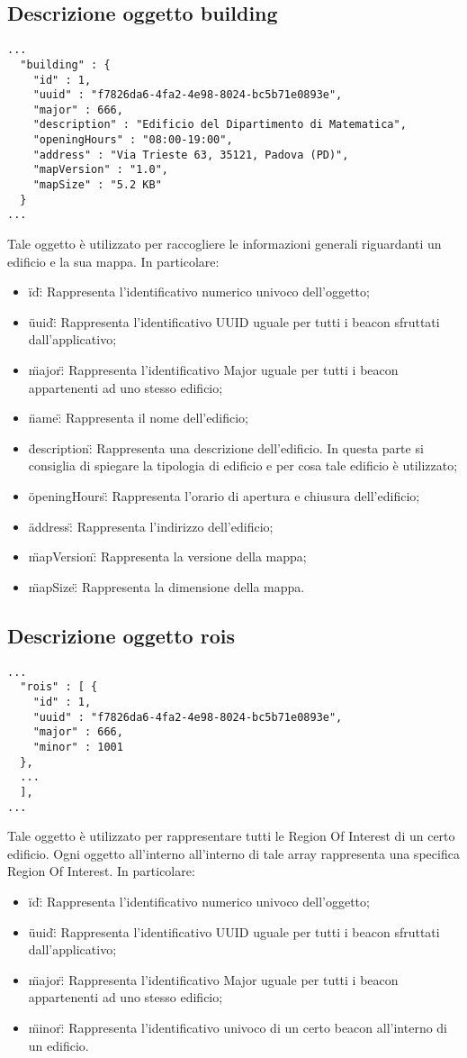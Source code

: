 \documentclass[../ManualeSviluppatore.tex]{subfiles}
\begin{document}
	\subsection{Descrizione oggetto building}
		\begin{lstlisting}
...
  "building" : {
    "id" : 1,
    "uuid" : "f7826da6-4fa2-4e98-8024-bc5b71e0893e",
    "major" : 666,
    "description" : "Edificio del Dipartimento di Matematica",
    "openingHours" : "08:00-19:00",
    "address" : "Via Trieste 63, 35121, Padova (PD)",
    "mapVersion" : "1.0",
    "mapSize" : "5.2 KB"
  }
...
		\end{lstlisting}
		Tale oggetto è utilizzato per raccogliere le informazioni generali riguardanti un edificio e la sua mappa. In particolare:
		\begin{itemize}
			\item \"id\": Rappresenta l'identificativo numerico univoco dell'oggetto;
			\item \"uuid\": Rappresenta l'identificativo UUID uguale per tutti i beacon sfruttati dall'applicativo;
			\item \"major\": Rappresenta l'identificativo Major uguale per tutti i beacon appartenenti ad uno stesso edificio;
			\item \"name\": Rappresenta il nome dell'edificio;
			\item \"description\": Rappresenta una descrizione dell'edificio. In questa parte si consiglia di spiegare la tipologia di edificio e per cosa tale edificio è utilizzato;
			\item \"openingHours\": Rappresenta l'orario di apertura e chiusura dell'edificio;
			\item \"address\": Rappresenta l'indirizzo dell'edificio;
			\item \"mapVersion\": Rappresenta la versione della mappa;
			\item \"mapSize\": Rappresenta la dimensione della mappa.
		\end{itemize} 
	\subsection{Descrizione oggetto rois}
		\begin{lstlisting}
...
  "rois" : [ {
    "id" : 1,
    "uuid" : "f7826da6-4fa2-4e98-8024-bc5b71e0893e",
    "major" : 666,
    "minor" : 1001
  },
  ...
  ],
...
		\end{lstlisting}
		Tale oggetto è utilizzato per rappresentare tutti le Region Of Interest di un certo edificio. Ogni oggetto all'interno all'interno di tale array rappresenta una specifica Region Of Interest. In particolare:
		\begin{itemize}
			\item \"id\": Rappresenta l'identificativo numerico univoco dell'oggetto;
			\item \"uuid\": Rappresenta l'identificativo UUID uguale per tutti i beacon sfruttati dall'applicativo;
			\item \"major\": Rappresenta l'identificativo Major uguale per tutti i beacon appartenenti ad uno stesso edificio;
			\item \"minor\": Rappresenta l'identificativo univoco di un certo beacon all'interno di un edificio.
		\end{itemize}
\end{document}
